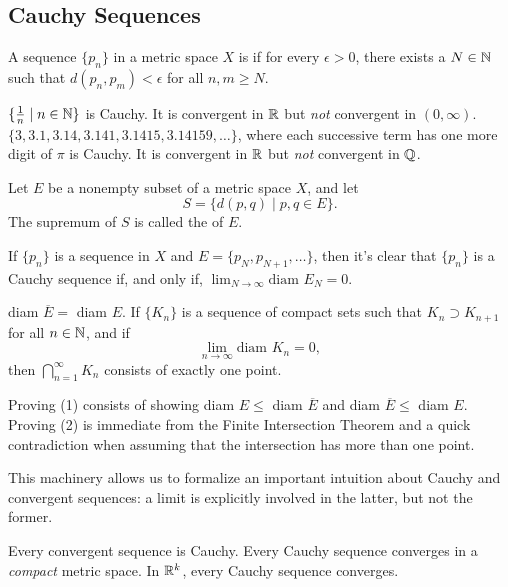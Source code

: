 \documentclass{article}
\begin{document}
\subsection{Cauchy Sequences}
\begin{definition}
    A sequence $\{p_{n}\}$ in a metric space $X$ is  if for every $\epsilon>0$, there exists a $N\in\mathbb N$ such that $d(p_{n},p_{m})<\epsilon$ for all $n,m\geq N$.
\end{definition}
\begin{example}
    \listhack 
    \ii $\{\frac{1}{n}\mid n\in\mathbb N\}$ is Cauchy. It is convergent in $\mathbb R$ but \textit{not} convergent in $(0,\infty)$.
    \ii $\{3, 3.1, 3.14, 3.141, 3.1415, 3.14159,\dotsc\}$, where each successive term has one more digit of $\pi$ is Cauchy. It is convergent in $\mathbb R$ but \textit{not} convergent in $\mathbb Q$.
\end{example}
\begin{definition}
    Let $E$ be a nonempty subset of a metric space $X$, and let \[S=\{d(p,q)\mid p,q\in E\}.\]The supremum of $S$ is called the  of $E$.
\end{definition}
\begin{remark}
    If $\{p_{n}\}$ is a sequence in $X$ and $E=\{p_{N},p_{N+1},\dotsc\}$, then it's clear that $\{p_{n}\}$ is a Cauchy sequence if, and only if, $\lim_{N\rightarrow\infty}\textrm{diam }E_{N}=0.$
\end{remark}
\begin{theorem}
    \listhack 
    \begin{enumerate}
        \ii diam $\overline{E}=$ diam $E$.
        \ii If $\{K_{n}\}$ is a sequence of compact sets such that $K_{n}\supset K_{n+1}$ for all $n\in\mathbb N$, and if \[\lim_{n\rightarrow\infty}\textrm{diam }K_{n}=0,\]then $\bigcap_{n=1}^{\infty}K_{n}$ consists of exactly one point.
    \end{enumerate}    
\end{theorem}
\begin{remark}
    Proving (1) consists of showing diam $E\leq$ diam $\overline{E}$ and diam $\overline{E}\leq$ diam $E$. Proving (2) is immediate from the Finite Intersection Theorem and a quick contradiction when assuming that the intersection has more than one point. 
\end{remark}
This machinery allows us to formalize an important intuition about Cauchy and convergent sequences: a limit is explicitly involved in the latter, but not the former.
\begin{theorem}
    \listhack 
    \begin{enumerate}
        \ii Every convergent sequence is Cauchy.
        \ii Every Cauchy sequence converges in a \textit{compact} metric space.
        \ii In $\mathbb R^{k}$, every Cauchy sequence converges.
    \end{enumerate}
\end{theorem}
\end{document}
